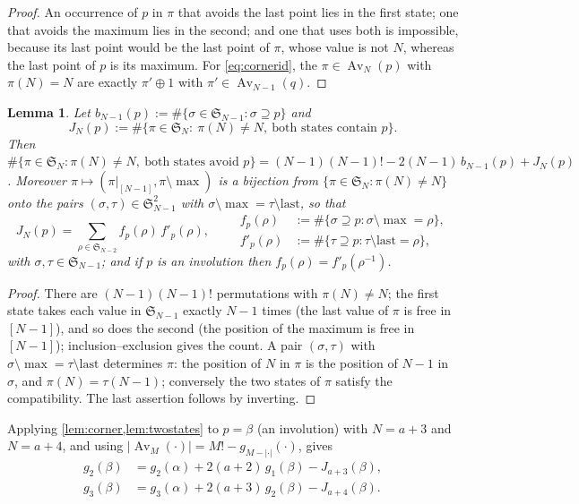 \documentclass[11pt,reqno]{amsart}
\theoremstyle{plain}
\newtheorem{lemma}[lemma]{Lemma}
\theoremstyle{definition}
\theoremstyle{remark}
\newcommand{\Av}{\operatorname{Av}}
\newcommand{\Sym}{\mathfrak{S}}
\begin{document}
\begin{proof}
An occurrence of $p$ in $\pi$ that avoids the last point lies in the first state; one that avoids the maximum lies in the second; and one that uses both is impossible, because its last point would be the last point of $\pi$, whose value is not $N$, whereas the last point of $p$ is its maximum. For \eqref{eq:cornerid}, the $\pi\in\Av_N(p)$ with $\pi(N)=N$ are exactly $\pi'\oplus1$ with $\pi'\in\Av_{N-1}(q)$.
\end{proof}

\begin{lemma}\label{lem:twostates}
Let $b_{N-1}(p):=\#\{\sigma\in\Sym_{N-1}:\sigma\supseteq p\}$ and
\[
J_N(p):=\#\{\pi\in\Sym_N:\ \pi(N)\ne N,\ \text{both states contain }p\}.
\]
Then $\#\{\pi\in\Sym_N:\pi(N)\ne N,\ \text{both states avoid }p\}=(N-1)(N-1)!-2(N-1)\,b_{N-1}(p)+J_N(p)$. Moreover $\pi\mapsto(\pi|_{[N-1]},\pi\setminus\!\max)$ is a bijection from $\{\pi\in\Sym_N:\pi(N)\ne N\}$ onto the pairs $(\sigma,\tau)\in\Sym_{N-1}^2$ with $\sigma\setminus\!\max=\tau\setminus\!\mathrm{last}$, so that
\begin{equation}\label{eq:Jsum}
J_N(p)=\sum_{\rho\in\Sym_{N-2}}f_p(\rho)\,f'_p(\rho),\qquad
\begin{aligned}
f_p(\rho)&:=\#\{\sigma\supseteq p:\sigma\setminus\!\max=\rho\},\\
f'_p(\rho)&:=\#\{\tau\supseteq p:\tau\setminus\!\mathrm{last}=\rho\},
\end{aligned}
\end{equation}
with $\sigma,\tau\in\Sym_{N-1}$; and if $p$ is an involution then $f_p(\rho)=f'_p(\rho^{-1})$.
\end{lemma}

\begin{proof}
There are $(N-1)(N-1)!$ permutations with $\pi(N)\ne N$; the first state takes each value in $\Sym_{N-1}$ exactly $N-1$ times (the last value of $\pi$ is free in $[N-1]$), and so does the second (the position of the maximum is free in $[N-1]$); inclusion--exclusion gives the count. A pair $(\sigma,\tau)$ with $\sigma\setminus\!\max=\tau\setminus\!\mathrm{last}$ determines $\pi$: the position of $N$ in $\pi$ is the position of $N-1$ in $\sigma$, and $\pi(N)=\tau(N-1)$; conversely the two states of $\pi$ satisfy the compatibility. The last assertion follows by inverting.
\end{proof}

Applying \cref{lem:corner,lem:twostates} to $p=\beta$ (an involution) with $N=a+3$ and $N=a+4$, and using $|\Av_M(\cdot)|=M!-g_{M-|\cdot|}(\cdot)$, gives
\begin{align}
g_2(\beta)&=g_2(\alpha)+2(a+2)\,g_1(\beta)-J_{a+3}(\beta),\label{eq:rec2}\\
g_3(\beta)&=g_3(\alpha)+2(a+3)\,g_2(\beta)-J_{a+4}(\beta).\label{eq:rec3}
\end{align}
\end{document}
